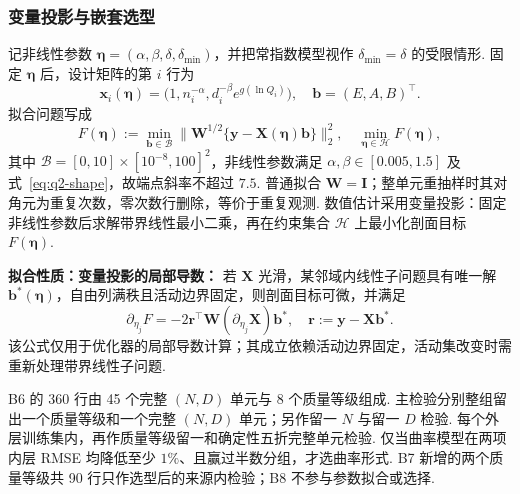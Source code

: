 \subsubsection{变量投影与嵌套选型}
记非线性参数 $\boldsymbol\eta=(\alpha,\beta,\delta,\delta_{\min})$，并把常指数模型视作 $\delta_{\min}=\delta$ 的受限情形. 固定 $\boldsymbol\eta$ 后，设计矩阵的第 $i$ 行为
\[
\mathbf x_i(\boldsymbol\eta)=
\bigl(1,n_i^{-\alpha},d_i^{-\beta}e^{g(\ln Q_i)}\bigr),
\quad \boldsymbol b=(E,A,B)^\top.
\]
拟合问题写成
\begin{equation}\label{eq:q2-variable-projection}
F(\boldsymbol\eta):=\min_{\boldsymbol b\in\mathcal B}
\|\mathbf W^{1/2}\{\boldsymbol y-\mathbf X(\boldsymbol\eta)\boldsymbol b\}\|_2^2,
\quad \min_{\boldsymbol\eta\in\mathcal H}F(\boldsymbol\eta),
\end{equation}
其中 $\mathcal B=[0,10]\times[10^{-8},100]^2$，非线性参数满足 $\alpha,\beta\in[0.005,1.5]$ 及式~\eqref{eq:q2-shape}，故端点斜率不超过 $7.5$. 普通拟合 $\mathbf W=\mathbf I$；整单元重抽样时其对角元为重复次数，零次数行删除，等价于重复观测. 数值估计采用变量投影：固定非线性参数后求解带界线性最小二乘，再在约束集合 $\mathcal H$ 上最小化剖面目标 $F(\boldsymbol\eta)$. 

\textbf{拟合性质：变量投影的局部导数：}
若 $\mathbf X$ 光滑，某邻域内线性子问题具有唯一解 $\boldsymbol b^*(\boldsymbol\eta)$，自由列满秩且活动边界固定，则剖面目标可微，并满足
\begin{equation}\label{eq:q2-projection-gradient}
\partial_{\eta_j}F=-2\boldsymbol r^\top\mathbf W
(\partial_{\eta_j}\mathbf X)\boldsymbol b^*,
\quad\boldsymbol r:=\boldsymbol y-\mathbf X\boldsymbol b^*.
\end{equation}
该公式仅用于优化器的局部导数计算；其成立依赖活动边界固定，活动集改变时需重新处理带界线性子问题. 

B6 的 360 行由 45 个完整 $(N,D)$ 单元与 8 个质量等级组成. 主检验分别整组留出一个质量等级和一个完整 $(N,D)$ 单元；另作留一 $N$ 与留一 $D$ 检验. 每个外层训练集内，再作质量等级留一和确定性五折完整单元检验. 仅当曲率模型在两项内层 RMSE 均降低至少 $1\%$、且赢过半数分组，才选曲率形式. B7 新增的两个质量等级共 90 行只作选型后的来源内检验；B8 不参与参数拟合或选择. 


